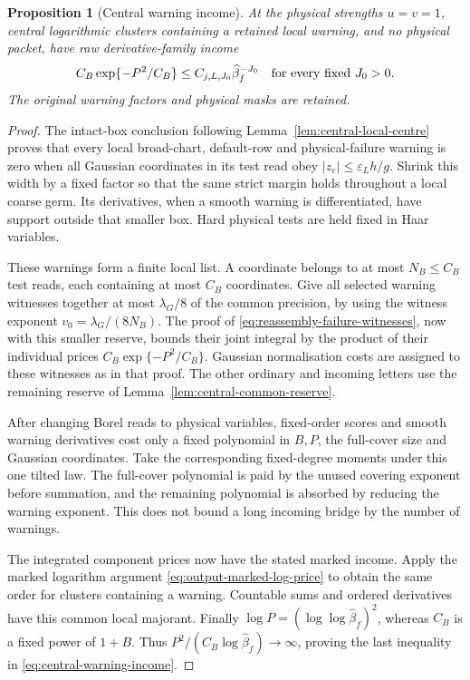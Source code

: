 \documentclass[11pt,reqno]{amsart}
\numberwithin{equation}{section}
\newtheorem{proposition}[theorem]{Proposition}
\theoremstyle{definition}
\theoremstyle{remark}
\begin{document}
\begin{proposition}[Central warning income]
\label{prop:central-warning-income}
At the physical strengths \(u=v=1\), central logarithmic
clusters containing a retained local warning, and no physical
packet, have raw derivative-family income
\begin{equation}
                C_B\exp\{-P^2/C_B\}
                         \le C_{j,L,J_0}\widehat\beta_f^{-J_0}
                 \quad\hbox{for every fixed }J_0>0.
 \label{eq:central-warning-income}
\end{equation}
The original warning factors and physical masks are retained.
\end{proposition}
\begin{proof}
The intact-box conclusion following
Lemma~\ref{lem:central-local-centre} proves that every local
broad-chart, default-row and physical-failure warning is
zero when all Gaussian coordinates in its test read obey
\(|z_e|\le\varepsilon_Lh/g\). Shrink this width by a fixed
factor so that the same strict margin holds throughout a
local coarse germ. Its derivatives, when a smooth warning
is differentiated, have support outside that smaller box.
Hard physical tests are held fixed in Haar variables.

These warnings form a finite local list. A coordinate
belongs to at most \(N_B\le C_B\) test reads, each containing
at most \(C_B\) coordinates. Give all selected warning
witnesses together at most \(\lambda_G/8\) of the common
precision, by using the witness exponent
\(v_0=\lambda_G/(8N_B)\). The proof of
\eqref{eq:reassembly-failure-witnesses}, now with this
smaller reserve, bounds their joint integral by the product
of their individual prices
\(C_B\exp\{-P^2/C_B\}\). Gaussian normalisation costs are
assigned to these witnesses as in that proof. The other
ordinary and incoming letters use the remaining reserve
of Lemma~\ref{lem:central-common-reserve}.

After changing Borel reads to physical variables, fixed-order
scores and smooth warning derivatives cost only a fixed
polynomial in \(B,P\), the full-cover size and Gaussian
coordinates. Take the corresponding fixed-degree moments
under this one tilted law. The full-cover polynomial is
paid by the unused covering exponent before summation,
and the remaining polynomial is absorbed by reducing the
warning exponent. This does not bound a long incoming
bridge by the number of warnings.

The integrated component prices now have the stated marked
income. Apply the marked logarithm argument
\eqref{eq:output-marked-log-price} to obtain the same order
for clusters containing a warning. Countable sums and
ordered derivatives have this common local majorant.
Finally \(\log P=(\log\log\widehat\beta_f)^2\), whereas
\(C_B\) is a fixed power of \(1+B\). Thus
\(P^2/(C_B\log\widehat\beta_f)\to\infty\), proving the
last inequality in \eqref{eq:central-warning-income}.
\end{proof}
\end{document}
